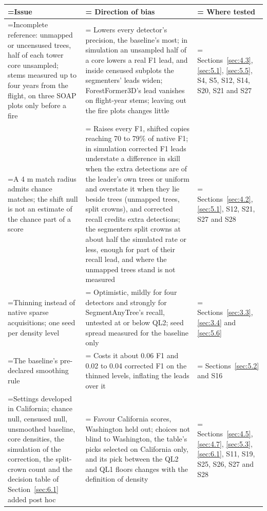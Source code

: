 \documentclass[preprint,12pt,authoryear,a4paper]{elsarticle}
\begin{document}
\begin{table}[!htbp]
\centering
{\footnotesize
\setlength{\tabcolsep}{3pt}
\renewcommand{\arraystretch}{1.15}
\begin{tabularx}{\linewidth}{>{\hsize\linewidth=\hsize}L>{\hsize\linewidth=\hsize}L>{\hsize\linewidth=\hsize}L}
\toprule
Issue & Direction of bias & Where tested \\
\midrule
Incomplete reference: unmapped or uncensused trees, half of each tower core unsampled; stems measured up to four years from the flight, on three SOAP plots only before a fire & Lowers every detector's precision, the baseline's most; in simulation an unsampled half of a core lowers a real F1 lead, and inside censused subplots the segmenters' leads widen; ForestFormer3D's lead vanishes on flight-year stems; leaving out the fire plots changes little & Sections~\ref{sec:4.3}, \ref{sec:5.1}, \ref{sec:5.5}, S4, S5, S12, S14, S20, S21 and S27 \\
A 4 m match radius admits chance matches; the shift null is not an estimate of the chance part of a score & Raises every F1, shifted copies reaching 70 to 79\% of native F1; in simulation corrected F1 leads understate a difference in skill when the extra detections are of the leader's own trees or uniform and overstate it when they lie beside trees (unmapped trees, split crowns), and corrected recall credits extra detections; the segmenters split crowns at about half the simulated rate or less, enough for part of their recall lead, and where the unmapped trees stand is not measured & Sections~\ref{sec:4.2}, \ref{sec:5.1}, S12, S21, S27 and S28 \\
Thinning instead of native sparse acquisitions; one seed per density level & Optimistic, mildly for four detectors and strongly for SegmentAnyTree's recall, untested at or below QL2; seed spread measured for the baseline only & Sections~\ref{sec:3.3}, \ref{sec:3.4} and \ref{sec:5.6} \\
The baseline's pre-declared smoothing rule & Costs it about 0.06 F1 and 0.02 to 0.04 corrected F1 on the thinned levels, inflating the leads over it & Sections~\ref{sec:5.2} and S16 \\
Settings developed in California; chance null, censused null, unsmoothed baseline, core densities, the simulation of the correction, the split-crown count and the decision table of Section~\ref{sec:6.1} added post hoc & Favour California scores, Washington held out; choices not blind to Washington, the table's picks selected on California only, and its pick between the QL2 and QL1 floors changes with the definition of density & Sections~\ref{sec:4.5}, \ref{sec:4.7}, \ref{sec:5.3}, \ref{sec:6.1}, S11, S19, S25, S26, S27 and S28 \\

\end{tabularx}}
\end{table}
\end{document}
